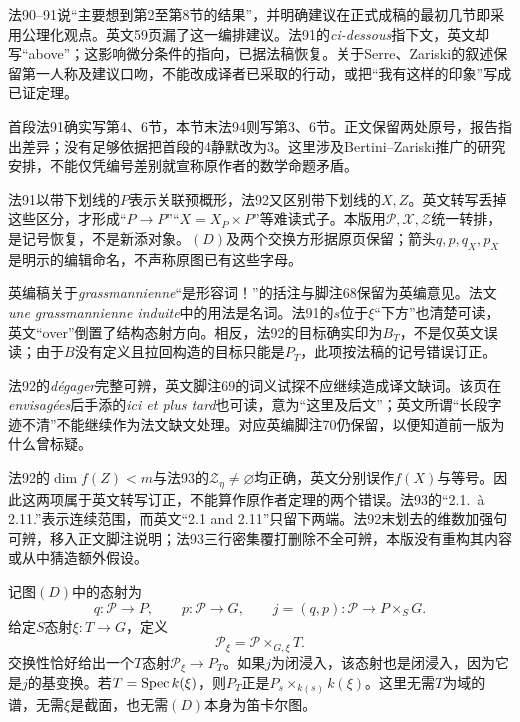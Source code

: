 法90--91说“主要想到第2至第8节的结果”，并明确建议在正式成稿的最初几节即采用公理化观点。英文59页漏了这一编排建议。法91的\textit{ci-dessous}指下文，英文却写“above”；这影响微分条件的指向，已据法稿恢复。关于Serre、Zariski的叙述保留第一人称及建议口吻，不能改成译者已采取的行动，或把“我有这样的印象”写成已证定理。

首段法91确实写第4、6节，本节末法94则写第3、6节。正文保留两处原号，报告指出差异；没有足够依据把首段的4静默改为3。这里涉及Bertini--Zariski推广的研究安排，不能仅凭编号差别就宣称原作者的数学命题矛盾。

法91以带下划线的$P$表示关联预概形，法92又区别带下划线的$X,Z$。英文转写丢掉这些区分，才形成“$P\to P$”“$X=X_P\times P$”等难读式子。本版用$\mathcal P,\mathcal X,\mathcal Z$统一转排，是记号恢复，不是新添对象。$(D)$及两个交换方形据原页保留；箭头$q,p,q_X,p_X$是明示的编辑命名，不声称原图已有这些字母。

英编稿关于\textit{grassmannienne}“是形容词！”的括注与脚注68保留为英编意见。法文\textit{une grassmannienne induite}中的用法是名词。法91的$s$位于$\xi$“下方”也清楚可读，英文“over”倒置了结构态射方向。相反，法92的目标确实印为$B_T$，不是仅英文误读；由于$B$没有定义且拉回构造的目标只能是$P_T$，此项按法稿的记号错误订正。

法92的\textit{dégager}完整可辨，英文脚注69的词义试探不应继续造成译文缺词。该页在\textit{envisagées}后手添的\textit{ici et plus tard}也可读，意为“这里及后文”；英文所谓“长段字迹不清”不能继续作为法文缺文处理。对应英编脚注70仍保留，以便知道前一版为什么曾标疑。

法92的$\dim f(Z)<m$与法93的$\mathcal Z_\eta\ne\varnothing$均正确，英文分别误作$f(X)$与等号。因此这两项属于英文转写订正，不能算作原作者定理的两个错误。法93的“2.1.\ à 2.11.”表示连续范围，而英文“2.1 and 2.11”只留下两端。法92末划去的维数加强句可辨，移入正文脚注说明；法93三行密集覆打删除不全可辨，本版没有重构其内容或从中猜造额外假设。

记图$(D)$中的态射为
\[
q:\mathcal P\longrightarrow P,\qquad
p:\mathcal P\longrightarrow G,
\qquad j=(q,p):\mathcal P\longrightarrow P\times_SG.
\]
给定$S$态射$\xi:T\to G$，定义
\[
\mathcal P_\xi=\mathcal P\times_{G,\xi}T.
\]
交换性恰好给出一个$T$态射$\mathcal P_\xi\to P_T$。如果$j$为闭浸入，该态射也是闭浸入，因为它是$j$的基变换。若$T=\operatorname{Spec} k(\xi)$，则$P_T$正是$P_s\times_{k(s)}k(\xi)$。这里无需$T$为域的谱，无需$\xi$是截面，也无需$(D)$本身为笛卡尔图。

